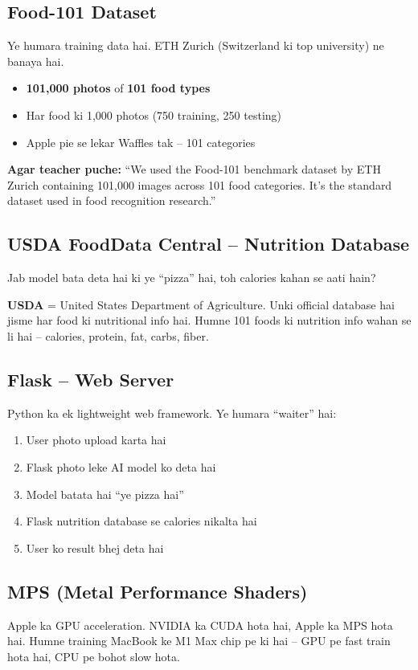 \documentclass[11pt,a4paper]{article}
\begin{document}
\subsection{Food-101 Dataset}
Ye humara training data hai. ETH Zurich (Switzerland ki top university) ne banaya hai.

\begin{itemize}[leftmargin=1.2cm]
\item \textbf{101,000 photos} of \textbf{101 food types}
\item Har food ki 1,000 photos (750 training, 250 testing)
\item Apple pie se lekar Waffles tak -- 101 categories
\end{itemize}

\textbf{Agar teacher puche:} ``We used the Food-101 benchmark dataset by ETH Zurich containing 101,000 images across 101 food categories. It's the standard dataset used in food recognition research.''

\subsection{USDA FoodData Central -- Nutrition Database}
Jab model bata deta hai ki ye ``pizza'' hai, toh calories kahan se aati hain?

\textbf{USDA} = United States Department of Agriculture. Unki official database hai jisme har food ki nutritional info hai. Humne 101 foods ki nutrition info wahan se li hai -- calories, protein, fat, carbs, fiber.

\subsection{Flask -- Web Server}
Python ka ek lightweight web framework. Ye humara ``waiter'' hai:
\begin{enumerate}[leftmargin=1.2cm]
\item User photo upload karta hai
\item Flask photo leke AI model ko deta hai
\item Model batata hai ``ye pizza hai''
\item Flask nutrition database se calories nikalta hai
\item User ko result bhej deta hai
\end{enumerate}

\subsection{MPS (Metal Performance Shaders)}
Apple ka GPU acceleration. NVIDIA ka CUDA hota hai, Apple ka MPS hota hai. Humne training MacBook ke M1 Max chip pe ki hai -- GPU pe fast train hota hai, CPU pe bohot slow hota.
\end{document}
